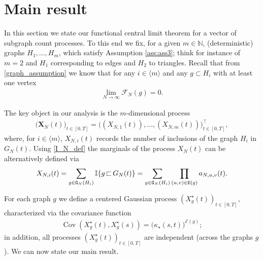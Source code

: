 \documentclass[11pt,reqno]{amsart}
\numberwithin{equation}{section}
\def\Var{\text{Var}}
\newcommand{\sprod}[1]{\langle#1\rangle}
\newcommand{\E}[1]{\mathbb{E}\left\{ #1\right\}}
\newcommand{\kb}[1]{\boldsymbol{#1}}
\newcommand{\vk}[1]{\kb{#1}}
\begin{document}
\section{Main result}\label{section:main_results} 

In this section we state our functional central limit theorem for a vector of  subgraph count processes. To this end we fix, for a given $m\in{\mathbb N}$,  (deterministic) graphs ${H}_1,\ldots,{H}_m$, which satisfy Assumption \ref{ass:ass3}; think for instance of $m=2$ and ${H}_1$ corresponding to edges and ${H}_2$ to triangles. 
Recall that from \eqref{graph_assumption} we know that for any $i\in\sprod{m}$ and any $g\subset {H}_i$ with at least one vertex
\begin{align}
    \lim_{N\to\infty}\mathcal{F}_N(g) = 0.\label{F_cal_zero_limit}
\end{align}


The key object in our analysis is the $m$-dimensional process
\begin{align*}
    \bigl(\vk X_N(t)\bigr)_{t\in[0,T]} = \big((X_{N,1}(t)),\ldots, (X_{N,m}(t))\big)_{{t\in[0,T]}}^{\top},
\end{align*}
where, for $i\in \sprod{m}$, $X_{N,i}(t)$ records the number of inclusions of the graph ${H}_i$ in $G_N(t)$. {Using \eqref{I_N_def} the marginals of the process $X_N(t)$ can be alternatively defined via
\begin{align}
    X_{N,i}(t)=\sum_{g\in{\tt G}_N({H}_i)}\mathbb{I}\{g{\,\sqsubset\,} G_N(t)\}=\sum_{g\in{\tt G}_N({H}_i)}\prod_{(u,v)\in{\tt E}(g)}a_{N,u,v}(t).\label{X_def_with_g}
\end{align}}

For each graph $g$ we define a centered Gaussian process $(X^{\star}_{g}(t))_{t\in[0,T]}$, characterized via the covariance function
\begin{align*}
    \operatorname{Cov}(X^{\star}_{g}(t),X^{\star}_g(s)) = \big(\kappa_{\star}(s,t)\big)^{\mathcal{E}(g)};
\end{align*}
in addition, all processes $(X^{\star}_{g}(t))_{t\in[0,T]}$ are independent (across the graphs $g$). 
We can now state our main result. 
\end{document}
